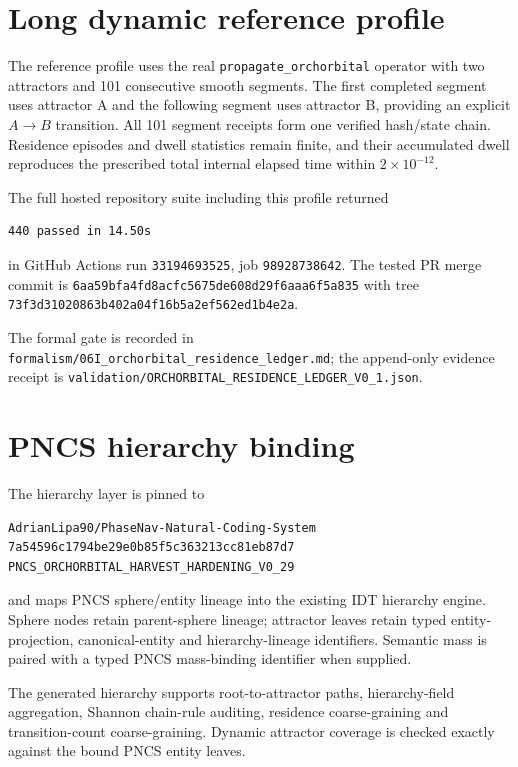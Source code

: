 \documentclass[11pt]{book}
\begin{document}
\section{Long dynamic reference profile}

The reference profile uses the real \texttt{propagate\_orchorbital} operator with two attractors and 101 consecutive smooth segments. The first completed segment uses attractor A and the following segment uses attractor B, providing an explicit \(A\to B\) transition. All 101 segment receipts form one verified hash/state chain. Residence episodes and dwell statistics remain finite, and their accumulated dwell reproduces the prescribed total internal elapsed time within \(2\times10^{-12}\).

The full hosted repository suite including this profile returned
\begin{verbatim}
440 passed in 14.50s
\end{verbatim}
in GitHub Actions run \texttt{33194693525}, job \texttt{98928738642}. The tested PR merge commit is
\texttt{6aa59bfa4fd8acfc5675de608d29f6aaa6f5a835}
with tree
\texttt{73f3d31020863b402a04f16b5a2ef562ed1b4e2a}.

The formal gate is recorded in \texttt{formalism/06I\_orchorbital\_residence\_ledger.md}; the append-only evidence receipt is \texttt{validation/ORCHORBITAL\_RESIDENCE\_LEDGER\_V0\_1.json}.

\section{PNCS hierarchy binding}

The hierarchy layer is pinned to
\begin{verbatim}
AdrianLipa90/PhaseNav-Natural-Coding-System
7a54596c1794be29e0b85f5c363213cc81eb87d7
PNCS_ORCHORBITAL_HARVEST_HARDENING_V0_29
\end{verbatim}
and maps PNCS sphere/entity lineage into the existing IDT hierarchy engine. Sphere nodes retain parent-sphere lineage; attractor leaves retain typed entity-projection, canonical-entity and hierarchy-lineage identifiers. Semantic mass is paired with a typed PNCS mass-binding identifier when supplied.

The generated hierarchy supports root-to-attractor paths, hierarchy-field aggregation, Shannon chain-rule auditing, residence coarse-graining and transition-count coarse-graining. Dynamic attractor coverage is checked exactly against the bound PNCS entity leaves.
\end{document}
